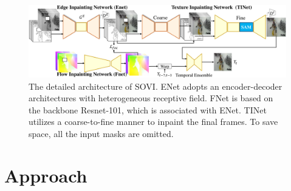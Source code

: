 \begin{figure}[t]
	\centering
	\includegraphics[width=2.0\columnwidth]{sti} %
	\caption{The detailed architecture of SOVI. ENet adopts an encoder-decoder architectures with heterogeneous receptive field.
	FNet is based on the backbone Resnet-101, which is associated with ENet. TINet utilizes a coarse-to-fine manner to inpaint the final frames. To save space, all the input masks are omitted.}
	
	\label{fig:stiNet}
\end{figure}

\section{Approach}
\label{sec:approach}

